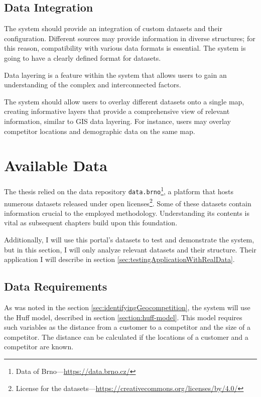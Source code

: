 \subsection{Data Integration}
\label{subsec:dataIntegration}

The system should provide an integration of custom datasets and their configuration. Different sources may provide information in diverse structures; for this reason, compatibility with various data formats is essential. The system is going to have a clearly defined format for datasets.

Data layering is a feature within the system that allows users to gain an understanding of the complex and interconnected factors.

The system should allow users to overlay different datasets onto a single map, creating informative layers that provide a comprehensive view of relevant information, similar to GIS data layering. For instance, users may overlay competitor locations and demographic data on the same map.

\section{Available Data}

The thesis relied on the data repository \texttt{data.brno}\footnote{Data of Brno---\url{https://data.brno.cz/}}, a platform that hosts numerous datasets released under open licenses\footnote{License for the datasets---\url{https://creativecommons.org/licenses/by/4.0/}}. Some of these datasets contain information crucial to the employed methodology. Understanding its contents is vital as subsequent chapters build upon this foundation. 

Additionally, I will use this portal's datasets to test and demonstrate the system, but in this section, I will only analyze relevant datasets and their structure. Their application I will describe in section \ref{sec:testingApplicationWithRealData}.

\subsection{Data Requirements}
\label{subsec:dataRequirements}

As was noted in the section \ref{sec:identifyingGeocompetition}, the system will use the Huff model, described in section \ref{section:huff-model}. This model requires such variables as the distance from a customer to a competitor and the size of a competitor. The distance can be calculated if the locations of a customer and a competitor are known.

